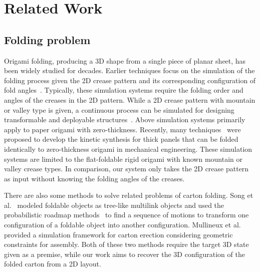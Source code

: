 \section{Related Work}\label{sec:relatedwork}
\subsection{Folding problem}

Origami folding, producing a 3D shape from a single piece of planar sheet, has been widely studied for decades. Earlier techniques focus on the simulation of the folding process given the 2D crease pattern and its corresponding configuration of fold angles~\cite{Thiel1998,Kishi:1998:OFP:786112.786279,Nimnual2007Virtual}. Typically, these simulation systems require the folding order and angles of the creases in the 2D pattern. 
%
While a 2D crease pattern with mountain or valley type is given, a continuous process can be simulated for designing transformable and deployable structures~\cite{tachi2009simulation,tachigeometric}.
%
Above simulation systems primarily apply to paper origami with zero-thickness. Recently, many techniques~\cite{tachi2011rigid,chen2015origami,2016arXiv160105747K} were proposed to develop the kinetic synthesis for thick panels that can be folded identically to zero-thickness origami in mechanical engineering.
%
These simulation systems are limited to the flat-foldable rigid origami with known mountain or valley crease types. In comparison, our system only takes the 2D crease pattern as input without knowing the folding angles of the creases. 

 
There are also some methods to solve related problems of carton folding. 
Song et al.~\cite{Song:2000:MPA:892954} modeled foldable objects as tree-like multilink objects and used the probabilistic roadmap methods~\cite{Kavraki:1994:PRP:891758} to find a sequence of motions to transform one configuration of a foldable object into another configuration. 
Mullineux et al.~\cite{Mullineux:2010:CSC:1739328.1739673} provided a simulation framework for carton erection considering geometric constraints for assembly.
Both of these two methods require the target 3D state given as a premise, while our work aims to recover the 3D configuration of the folded carton from a 2D layout.

